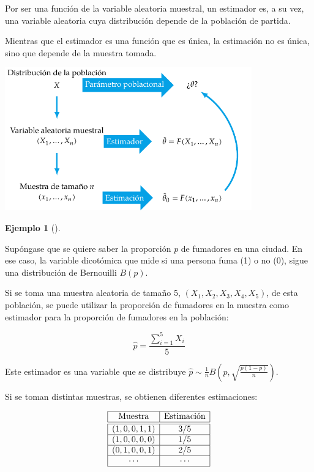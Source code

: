 \documentclass[
  a4paper,
]{scrreport}
\theoremstyle{plain}
\theoremstyle{definition}
\theoremstyle{definition}
\newtheorem{example}{Ejemplo}[chapter]
\theoremstyle{remark}
\begin{document}
Por ser una función de la variable aleatoria muestral, un estimador es,
a su vez, una variable aleatoria cuya distribución depende de la
población de partida.

Mientras que el estimador es una función que es única, la estimación no
es única, sino que depende de la muestra tomada.

\begin{center}
\includegraphics[width=0.8\textwidth,height=\textheight]{img/estimacion/estimador-estimacion.pdf}
\end{center}

\begin{example}[]\protect\hypertarget{exm-estimacion-fumadores}{}\label{exm-estimacion-fumadores}

Supóngase que se quiere saber la proporción \(p\) de fumadores en una
ciudad. En ese caso, la variable dicotómica que mide si una persona fuma
(1) o no (0), sigue una distribución de Bernouilli \(B(p)\).

Si se toma una muestra aleatoria de tamaño 5, \((X_1,X_2,X_3,X_4,X_5)\),
de esta población, se puede utilizar la proporción de fumadores en la
muestra como estimador para la proporción de fumadores en la población:

\[
\hat p = \frac{\sum_{i=1}^5 X_i}{5}
\]

Este estimador es una variable que se distribuye
\(\hat p\sim \frac{1}{n}B\left(p,\sqrt{\frac{p(1-p)}{n}}\right)\).

Si se toman distintas muestras, se obtienen diferentes estimaciones:

\[
\begin{array}{|c|c|}
\hline
\mbox{Muestra} & \mbox{Estimación}\\
\hline\hline
(1, 0, 0, 1, 1) & 3/5\\
\hline
(1, 0, 0, 0, 0) & 1/5\\
\hline
(0, 1, 0, 0, 1) & 2/5\\
\hline
\cdots & \cdots\\
\hline
\end{array}
\]

\end{example}
\end{document}
